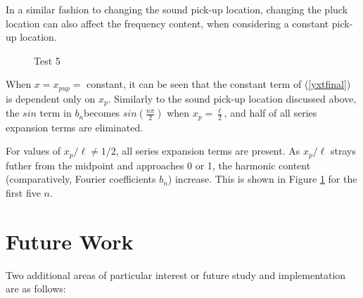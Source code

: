 \documentclass[%
 reprint,
 amsmath,amssymb,
 aps,
]{revtex4-1}
\begin{document}
In a similar fashion to changing the sound pick-up location, changing the pluck location can also affect the frequency content, when considering a constant pick-up location. \\
\begin{figure}[h]
\caption{Test 5}
\label{Test5}
\end{figure}
When $x = x_{pup}= $ constant, it can be seen that the constant term of (\ref{yxtfinal}) is dependent only on $x_p$. Similarly to the sound pick-up location discussed above, the $sin$ term in $b_n$becomes $sin(\frac{n \pi}{2})$ when  $x_{p} = \frac{\ell}{2}$, and half of all series expansion terms are eliminated.

For values of $x_p/\ell \neq 1/2$, all series expansion terms are present. As $x_p/\ell$ strays futher from the midpoint and approaches 0 or 1, the harmonic content (comparatively, Fourier coefficients $b_n$) increase. This is shown in Figure \ref{Test5} for the first five $n$.



\section{\label{sec:level1}Future Work}

Two additional areas of particular interest or future study and implementation are as follows:\\
\end{document}
